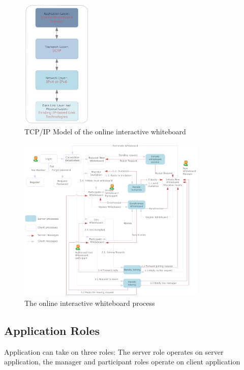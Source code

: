 \documentclass[conference]{IEEEtran}
\begin{document}
 \begin{figure}[h]
\begin{center}
\includegraphics[width=0.3\textwidth]{iw_tcpip.png}
\caption{TCP/IP Model of the online interactive whiteboard}
\label{fig:4}
\end{center}
\end{figure}
 \begin{figure}[t]
\begin{center}
\includegraphics[width=0.8\textwidth]{process}
\caption{The online interactive whiteboard process}
\label{fig:3}
\end{center}
\end{figure}

\subsection{Application Roles}
Application can take on three roles: The server role operates on server application, the manager and participant roles operate on client application
\end{document}
